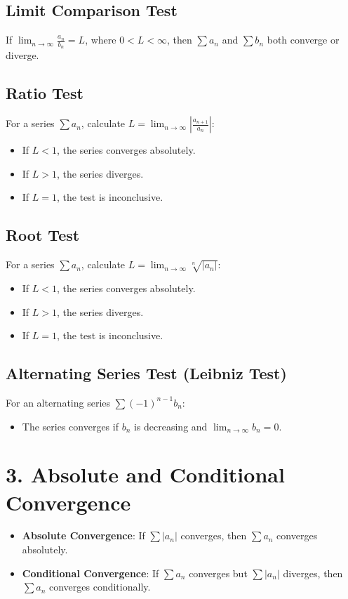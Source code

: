 \documentclass{article}
\begin{document}
\subsection*{Limit Comparison Test}
If $\lim_{n \to \infty} \frac{a_n}{b_n} = L$, where $0 < L < \infty$, then $\sum a_n$ and $\sum b_n$ both converge or diverge.

\subsection*{Ratio Test}
For a series $\sum a_n$, calculate $L = \lim_{n \to \infty} \left| \frac{a_{n+1}}{a_n} \right|$:
\begin{itemize}
    \item If $L < 1$, the series converges absolutely.
    \item If $L > 1$, the series diverges.
    \item If $L = 1$, the test is inconclusive.
\end{itemize}

\subsection*{Root Test}
For a series $\sum a_n$, calculate $L = \lim_{n \to \infty} \sqrt[n]{|a_n|}$:
\begin{itemize}
    \item If $L < 1$, the series converges absolutely.
    \item If $L > 1$, the series diverges.
    \item If $L = 1$, the test is inconclusive.
\end{itemize}

\subsection*{Alternating Series Test (Leibniz Test)}
For an alternating series $\sum (-1)^{n-1} b_n$:
\begin{itemize}
    \item The series converges if $b_n$ is decreasing and $\lim_{n \to \infty} b_n = 0$.
\end{itemize}

\section*{3. Absolute and Conditional Convergence}
\begin{itemize}
    \item \textbf{Absolute Convergence}: If $\sum |a_n|$ converges, then $\sum a_n$ converges absolutely.
    \item \textbf{Conditional Convergence}: If $\sum a_n$ converges but $\sum |a_n|$ diverges, then $\sum a_n$ converges conditionally.
\end{itemize}
\end{document}
